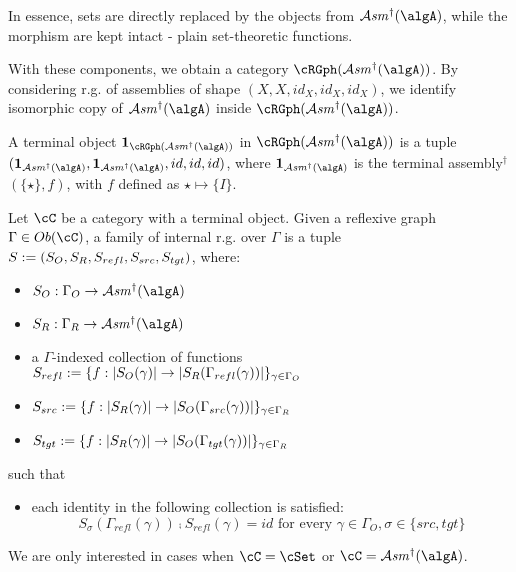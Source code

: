 \documentclass[12pt,a4paper]{article}
\def\cAsm{\mathcal{A}\mathit{sm}^\dagger}
\def\src{_{src}}\alwaysmath{src}
\def\rfl{_{refl}}\alwaysmath{rfl}
\def\tgt{_{tgt}}\alwaysmath{tgt}
\renewcommand{\O}{_{O}}
\newcommand{\R}{\ensuremath{_{R}}}
\begin{document}
In essence, sets are directly replaced by the objects from $\cAsm(\algA)$, while the morphism are kept intact - plain set-theoretic functions.

With these components, we obtain a category $\cRGph(\cAsm(\algA))$. By considering r.g. of assemblies of shape $(X,X,id_X,id_X,id_X)$, we identify isomorphic copy of $\cAsm(\algA)$ inside $\cRGph(\cAsm(\algA))$.

A terminal object $\mathbf{1}_{\cRGph(\cAsm(\algA))}$ in $\cRGph(\cAsm(\algA))$ is a tuple $(\mathbf{1}_{\cAsm(\algA)}, \mathbf{1}_{\cAsm(\algA)}, id, id, id)$, where $\mathbf{1}_{\cAsm(\algA)}$ is the terminal assembly$^\dagger$ $(\{\star\},f)$, with $f$ defined as $\star \mapsto \{I\}$.

\begin{definition}
  \label{def:fam-refl-graphs}
  Let $\cC$ be a category with a terminal object. Given a reflexive graph $\Gamma \in \ob\cC$, a family of internal r.g. over $\Gamma$ is a tuple $S\define(S_O, S_R, S\rfl, S\src, S\tgt)$, where:
  \begin{itemize}[noitemsep]
    \item $S\O : \Gamma\O \to \cAsm(\algA)$
    \item $S\R : \Gamma\R \to \cAsm(\algA)$
    \item a $\Gamma$-indexed collection of functions $S\rfl \define \{f: \carr{S\O(\gamma)} \to \carr{S\R(\Gamma\rfl(\gamma))} \}_{\gamma \in \Gamma\O}$
    \item $S\src \define \{f: \carr{S\R(\gamma)} \to \carr{S\O(\Gamma\src(\gamma))} \}_{\gamma \in \Gamma\R}$
    \item $S\tgt \define \{f: \carr{S\R(\gamma)} \to \carr{S\O(\Gamma\tgt(\gamma))} \}_{\gamma \in \Gamma\R}$ 
  \end{itemize}
  such that 
  \begin{itemize}[noitemsep]
    \item each identity in the following collection is satisfied:
     $$S_\sigma(\Gamma\rfl(\gamma)) \comp S\rfl(\gamma) = id \text{ for every } \gamma \in \Gamma\O, \sigma \in \{src, tgt \}$$
  \end{itemize}

\end{definition}
We are only interested in cases when $\cC = \cSet$ or $\cC = \cAsm(\algA)$. 
\end{document}
